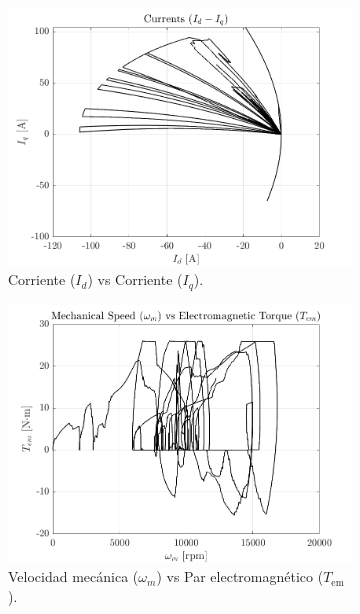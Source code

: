 \begin{figure}[!htb]
\begin{subfigure}{0.4\textwidth}
        \includegraphics[width=\linewidth]{fig/id-iq_plot.png}
        \caption{Corriente ($I_{d}$) vs Corriente ($I_{q}$).}
    \end{subfigure}
    \begin{subfigure}{0.4\textwidth}
        \includegraphics[width=\linewidth]{fig/wm_Tem_plot.png}
        \caption{Velocidad mecánica ($\omega_{m}$) vs Par electromagnético ($T_{\text{em}}$).}
    \end{subfigure}
    \begin{subfigure}{0.4\textwidth}

\end{subfigure}
\end{figure}
